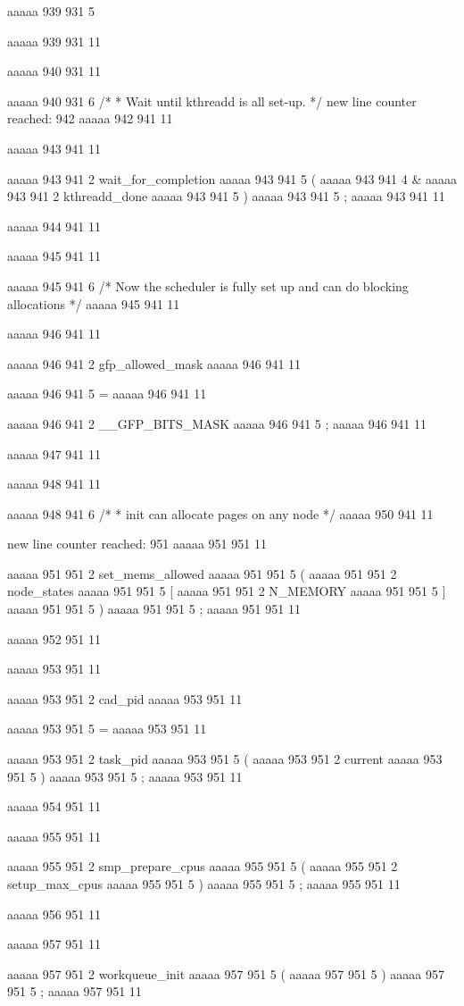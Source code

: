 aaaaa 939 931
5
{
aaaaa 939 931
11


aaaaa 940 931
11
	
aaaaa 940 931
6
/*
	 * Wait until kthreadd is all set-up.
	 */
new line counter reached: 942
aaaaa 942 941
11


aaaaa 943 941
11
	
aaaaa 943 941
2
wait_for_completion
aaaaa 943 941
5
(
aaaaa 943 941
4
&
aaaaa 943 941
2
kthreadd_done
aaaaa 943 941
5
)
aaaaa 943 941
5
;
aaaaa 943 941
11


aaaaa 944 941
11


aaaaa 945 941
11
	
aaaaa 945 941
6
/* Now the scheduler is fully set up and can do blocking allocations */
aaaaa 945 941
11


aaaaa 946 941
11
	
aaaaa 946 941
2
gfp_allowed_mask
aaaaa 946 941
11
 
aaaaa 946 941
5
=
aaaaa 946 941
11
 
aaaaa 946 941
2
__GFP_BITS_MASK
aaaaa 946 941
5
;
aaaaa 946 941
11


aaaaa 947 941
11


aaaaa 948 941
11
	
aaaaa 948 941
6
/*
	 * init can allocate pages on any node
	 */
aaaaa 950 941
11


new line counter reached: 951
aaaaa 951 951
11
	
aaaaa 951 951
2
set_mems_allowed
aaaaa 951 951
5
(
aaaaa 951 951
2
node_states
aaaaa 951 951
5
[
aaaaa 951 951
2
N_MEMORY
aaaaa 951 951
5
]
aaaaa 951 951
5
)
aaaaa 951 951
5
;
aaaaa 951 951
11


aaaaa 952 951
11


aaaaa 953 951
11
	
aaaaa 953 951
2
cad_pid
aaaaa 953 951
11
 
aaaaa 953 951
5
=
aaaaa 953 951
11
 
aaaaa 953 951
2
task_pid
aaaaa 953 951
5
(
aaaaa 953 951
2
current
aaaaa 953 951
5
)
aaaaa 953 951
5
;
aaaaa 953 951
11


aaaaa 954 951
11


aaaaa 955 951
11
	
aaaaa 955 951
2
smp_prepare_cpus
aaaaa 955 951
5
(
aaaaa 955 951
2
setup_max_cpus
aaaaa 955 951
5
)
aaaaa 955 951
5
;
aaaaa 955 951
11


aaaaa 956 951
11


aaaaa 957 951
11
	
aaaaa 957 951
2
workqueue_init
aaaaa 957 951
5
(
aaaaa 957 951
5
)
aaaaa 957 951
5
;
aaaaa 957 951
11


}
